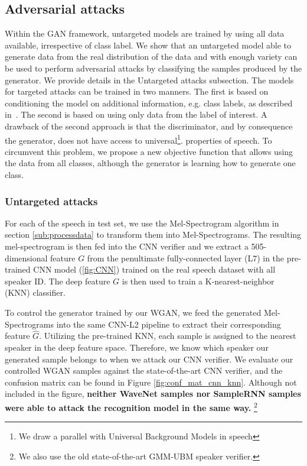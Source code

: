 \subsection{Adversarial attacks}

Within the GAN framework, untargeted models are trained by using all data available, irrespective of class label. We show that an untargeted model able to generate data from the real distribution of the data and with enough variety can be used to perform adversarial attacks by classifying the samples produced by the generator. We provide details in the Untargeted attacks subsection.
The models for targeted attacks can be trained in two manners. The first is based on conditioning the model on additional information, e.g. class labels, as described in~\cite{mirza2014conditional}. The second is based on using only data from the label of interest. A drawback of the second approach is that the discriminator, and by consequence the generator, does not have access to universal\footnote{We draw a parallel with Universal Background Models in speech}. properties of speech. To circumvent this problem, we propose a new objective function that allows using the data from all classes, although the generator is learning how to generate one class. 

\subsubsection{Untargeted attacks}

For each of the speech in test set, we use the Mel-Spectrogram algorithm in section \ref{sub:processdata} to transform them into Mel-Spectrograms. The resulting mel-spectrogram is then fed into the CNN verifier and we extract a 505-dimensional feature $G$ from the penultimate fully-connected layer (L7) in the pre-trained CNN model (\ref{fig:CNN}) trained on the real speech dataset with all speaker ID. The deep feature $G$ is then used to train a K-nearest-neighbor (KNN) classifier.

To control the generator trained by our WGAN, we feed the generated Mel-Spectrograms into the same CNN-L2 pipeline to extract their corresponding feature $\widehat G$. Utilizing the pre-trained KNN, each sample is assigned to the nearest speaker in the deep feature space. Therefore, we know which speaker our generated sample belongs to when we attack our CNN verifier. We evaluate our controlled WGAN samples against the state-of-the-art CNN verifier, and the confusion matrix can be found in Figure \ref{fig:conf_mat_cnn_knn}. Although not included in the figure, \textbf{neither WaveNet samples nor SampleRNN samples were able to attack the recognition model in the same way.} \footnote{We also use the old state-of-the-art GMM-UBM speaker verifier.}


